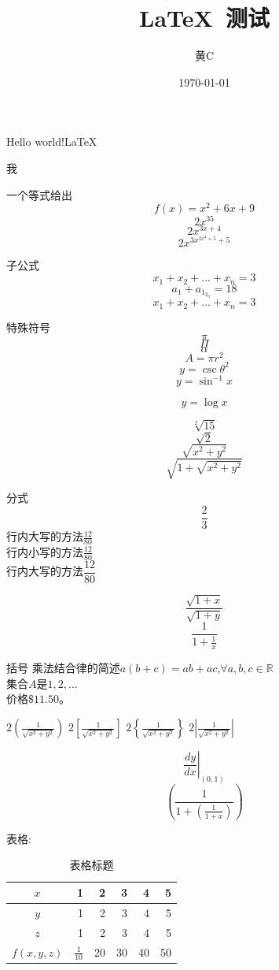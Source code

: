 \documentclass[10pt, a4paper]{article}
\title{\LaTeX\ 测试}
\author{黄C}
\date{\today}
\begin{document}
\maketitle
\tableofcontents
Hello world!\LaTeX\

我

一个等式给出 $${f(x)=x^2 + 6x + 9}$$
$$2x^{35}$$
$$2x^{3x+4}$$
$$2x^{3x^{3x^4+5}+5}$$

子公式
$$x_1 + x_2 + ... + x_n = 3$$
$$a_1 + a_{1_{2_{3}}} = 18$$
$$x_1 + x_2 + \ldots + x_n = 3$$

特殊符号
$$\pi$$
$$\Pi$$
$$\alpha$$
$$A = \pi r^2$$
$$y=\csc \theta^2$$
$$y=\sin^{-1} x $$

$$y=\log x$$

$$\sqrt[2]{15}$$
$$\sqrt{2}$$
$$\sqrt{x^2+y^2}$$
$$\sqrt{1+\sqrt{x^2+y^2}}$$

分式
$$\frac{2}{3}$$
行内大写的方法$\displaystyle \frac{12}{80}$\\[8pt]
行内小写的方法$\frac{12}{80}$\\[8pt]
行内大写的方法$\dfrac{12}{80}$  %

$$\frac{\sqrt{1+x}}{\sqrt{1+y}}$$
$$\frac{1}{1+\frac{1}{x}}$$

括号
乘法结合律的简述$a(b+c)=ab+ac$,$\forall a, b, c \in \mathbb{R}$ \\
集合$A$是${1, 2, \ldots}$\\
价格$\$11.50$。

$2\left(\frac{1}{\sqrt{x^2+y^2}}\right)$
$2\left[\frac{1}{\sqrt{x^2+y^2}}\right]$
$2\left\{\frac{1}{\sqrt{x^2+y^2}}\right\}$
$2\left| \frac{1}{\sqrt{x^2+y^2}}\right| $

$$\left. \frac{dy}{dx}\right| _{(0, 1)}$$
$$\left( \frac{1}{1+\left(\frac{1}{1+x}\right)} \right) $$

表格:\\
\begin{table}[H]
    \centering  %
    \def\arraystretch{1.5}  %
\begin{tabular}{|c||r|r|r|r|r|} %
    \hline
    $x$         & 1 & 2 & 3 & 4 & 5 \\    \hline
    $y$         & 1 & 2 & 3 & 4 & 5 \\    \hline
    $z$         & 1 & 2 & 3 & 4 & 5 \\    \hline
    $f(x, y, z)$ & $\frac{1}{10}$ & 20 & 30 & 40 & 50 \\  \hline
\end{tabular}
\caption{表格标题}
\end{table}
\end{document}

